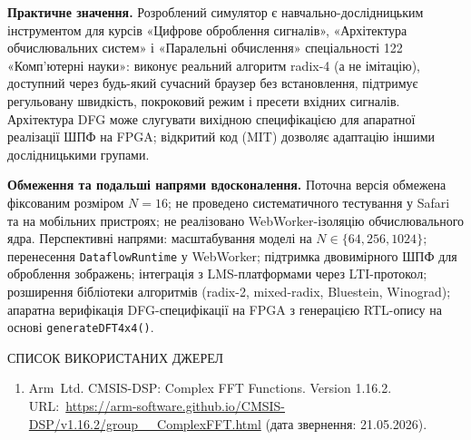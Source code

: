 \documentclass[
]{article}
\newcommand{\passthrough}[1]{#1}
\begin{document}
\textbf{Практичне значення.} Розроблений симулятор є
навчально-дослідницьким інструментом для курсів «Цифрове оброблення
сигналів», «Архітектура обчислювальних систем» і «Паралельні обчислення»
спеціальності 122 «Комп'ютерні науки»: виконує реальний алгоритм radix-4
(а не імітацію), доступний через будь-який сучасний браузер без
встановлення, підтримує регульовану швидкість, покроковий режим і
пресети вхідних сигналів. Архітектура DFG може слугувати вихідною
специфікацією для апаратної реалізації ШПФ на FPGA; відкритий код (MIT)
дозволяє адаптацію іншими дослідницькими групами.

\textbf{Обмеження та подальші напрями вдосконалення.} Поточна версія
обмежена фіксованим розміром \(N = 16\); не проведено систематичного
тестування у Safari та на мобільних пристроях; не реалізовано
WebWorker-ізоляцію обчислювального ядра. Перспективні напрями:
масштабування моделі на \(N \in \{ 64,256,1024\}\); перенесення
\passthrough{\lstinline!DataflowRuntime!} у WebWorker; підтримка
двовимірного ШПФ для оброблення зображень; інтеграція з LMS-платформами
через LTI-протокол; розширення бібліотеки алгоритмів (radix-2,
mixed-radix, Bluestein, Winograd); апаратна верифікація DFG-специфікації
на FPGA з генерацією RTL-опису на основі
\passthrough{\lstinline!generateDFT4x4()!}.

\protect{}\label{_Toc230737410}{}СПИСОК ВИКОРИСТАНИХ ДЖЕРЕЛ

\begin{enumerate}
\def\labelenumi{\arabic{enumi})}
\item
  Arm~Ltd. CMSIS-DSP: Complex FFT Functions. Version 1.16.2.
  URL:~\url{https://arm-software.github.io/CMSIS-DSP/v1.16.2/group__ComplexFFT.html}
  (дата звернення: 21.05.2026).
\end{enumerate}
\end{document}
